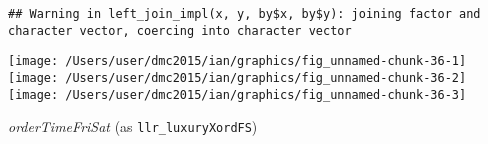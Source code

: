 \documentclass[10pt]{report}
\newenvironment{Shaded}{}{}
\newcommand{\KeywordTok}[1]{\textcolor[rgb]{0.00,0.44,0.13}{\textbf{{#1}}}}
\newcommand{\DataTypeTok}[1]{\textcolor[rgb]{0.56,0.13,0.00}{{#1}}}
\newcommand{\StringTok}[1]{\textcolor[rgb]{0.25,0.44,0.63}{{#1}}}
\newcommand{\NormalTok}[1]{{#1}}
\begin{document}
\begin{Shaded}
\end{Shaded}

\begin{verbatim}
## Warning in left_join_impl(x, y, by$x, by$y): joining factor and character vector, coercing into character vector
\end{verbatim}

\begin{Shaded}
\end{Shaded}

\begin{center}\texttt{[image: /Users/user/dmc2015/ian/graphics/fig\_unnamed-chunk-36-1]} \texttt{[image: /Users/user/dmc2015/ian/graphics/fig\_unnamed-chunk-36-2]} \texttt{[image: /Users/user/dmc2015/ian/graphics/fig\_unnamed-chunk-36-3]} \end{center}

\emph{orderTimeFriSat} (as \texttt{llr\_luxuryXordFS})
\end{document}
